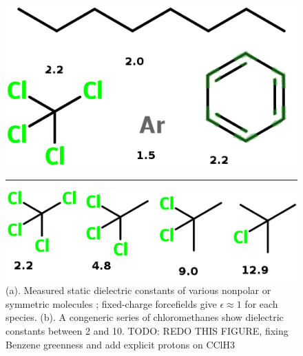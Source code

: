 \documentclass[aps,pre,twocolumn,nofootinbib,superscriptaddress,linenumbers]{revtex4-1}
\begin{document}
\begin{figure}

\includegraphics[width=\columnwidth]{./figures/nonpolar_molecules.png}

\noindent\rule{8cm}{0.4pt}

\includegraphics[width=\columnwidth]{./figures/chloro_methanes.png}

\caption{(a). Measured static dielectric constants of various nonpolar or symmetric molecules \cite{wikipedia}; fixed-charge forcefields give $\epsilon \approx 1$ for each species.  
(b).  A congeneric series of chloromethanes show dielectric constants between 2 and 10.  TODO: REDO THIS FIGURE, fixing Benzene greenness and add explicit protons on CClH3
}
\label{figure:nonpolars}

\end{figure}
\end{document}
